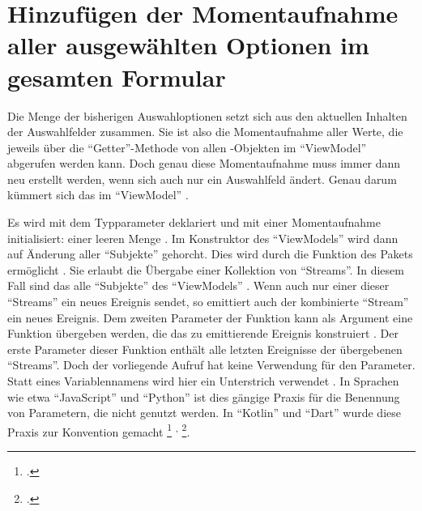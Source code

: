 \section{Hinzufügen der Momentaufnahme aller ausgewählten Optionen im gesamten Formular}

Die Menge der bisherigen Auswahloptionen setzt sich aus den aktuellen Inhalten der Auswahlfelder zusammen.
Sie ist also die Momentaufnahme aller Werte,
die jeweils über die \enquote{Getter}-Methode  von allen -Objekten im \enquote{ViewModel} abgerufen werden kann.
Doch genau diese Momentaufnahme muss immer dann neu erstellt werden,
wenn sich auch nur ein Auswahlfeld ändert.
Genau darum kümmert sich das   im \enquote{ViewModel} \Lst{\ref{lst:Schritt4priorChoices}}.



Es wird mit dem Typparameter  deklariert  und mit einer Momentaufnahme initialisiert: einer leeren Menge \IC{{}} .
Im Konstruktor des \enquote{ViewModels} wird dann auf Änderung aller \enquote{Subjekte} gehorcht.
Dies wird durch die Funktion  des Pakets  ermöglicht .
Sie erlaubt die Übergabe einer Kollektion von \enquote{Streams}.
In diesem Fall sind das alle \enquote{Subjekte} des \enquote{ViewModels} .
Wenn auch nur einer dieser \enquote{Streams} ein neues Ereignis sendet,
so emittiert auch der kombinierte \enquote{Stream} ein neues Ereignis.
Dem zweiten Parameter der Funktion  kann als Argument eine Funktion übergeben werden,
die das zu emittierende Ereignis konstruiert .
Der erste Parameter dieser Funktion enthält alle letzten Ereignisse der übergebenen \enquote{Streams}.
Doch der vorliegende Aufruf hat keine Verwendung für den Parameter.
Statt eines Variablennamens wird hier ein Unterstrich \IC{_} verwendet .
In Sprachen wie etwa \enquote{JavaScript} und \enquote{Python} ist dies gängige Praxis für die Benennung von Parametern,
die nicht genutzt werden.
In \enquote{Kotlin} und \enquote{Dart} wurde diese Praxis zur Konvention gemacht
\footcite[Vgl.][]{DartEffectiveDartStylePREFERusingUnderscore}
\textsuperscript{,}
\footcite[Vgl.][]{KotlinHighOrderFunctionsAndLambdasUnderscoreForUnusedVariables}.

